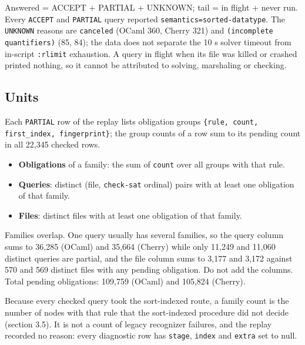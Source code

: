 \documentclass[10pt,a4paper]{article}
\begin{document}
Answered = ACCEPT + PARTIAL + UNKNOWN; tail = in flight + never run. Every \texttt{ACCEPT} and \texttt{PARTIAL} query reported \texttt{semantics=\allowbreak{}sorted-{}\allowbreak{}datatype}. The \texttt{UNKNOWN} reasons are \texttt{canceled} (OCaml 360, Cherry 321) and \texttt{(\allowbreak{}incomplete quantifiers)} (85, 84); the data does not separate the 10 s solver timeout from in-script \texttt{:\allowbreak{}rlimit} exhaustion. A query in flight when its file was killed or crashed printed nothing, so it cannot be attributed to solving, marshaling or checking.

\subsection{Units}\label{sec:a3-units}

Each \texttt{PARTIAL} row of the replay lists obligation groups \texttt{\{rule,\allowbreak{} count,\allowbreak{} first\_\allowbreak{}index,\allowbreak{} fingerprint\}}; the group counts of a row sum to its pending count in all 22,345 checked rows.

\begin{itemize}\setlength{\itemsep}{1pt}\setlength{\parskip}{0pt}

\item \textbf{Obligations} of a family: the sum of \texttt{count} over all groups with that rule.

\item \textbf{Queries}: distinct (file, \texttt{check-{}\allowbreak{}sat} ordinal) pairs with at least one obligation of that family.

\item \textbf{Files}: distinct files with at least one obligation of that family.

\end{itemize}

Families overlap. One query usually has several families, so the query column sums to 36,285 (OCaml) and 35,664 (Cherry) while only 11,249 and 11,060 distinct queries are partial, and the file column sums to 3,177 and 3,172 against 570 and 569 distinct files with any pending obligation. Do not add the columns. Total pending obligations: 109,759 (OCaml) and 105,824 (Cherry).

Because every checked query took the sort-indexed route, a family count is the number of nodes with that rule that the sort-indexed procedure did not decide (section 3.5). It is not a count of legacy recognizer failures, and the replay recorded no reason: every diagnostic row has \texttt{stage}, \texttt{index} and \texttt{extra} set to null.
\end{document}
